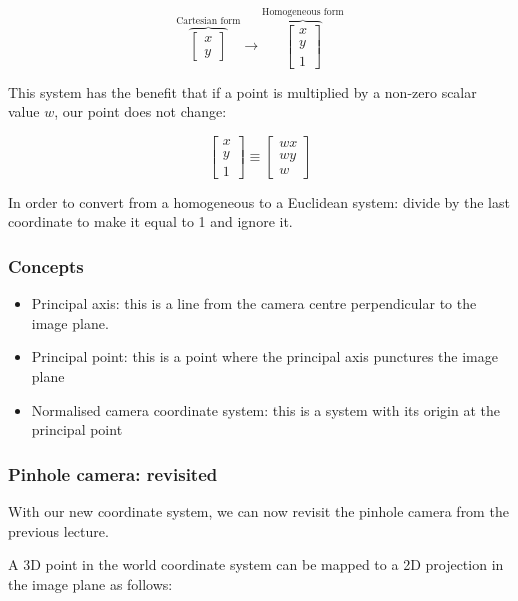 \documentclass{article}
\begin{document}
\[
  \overbrace{\begin{bmatrix}
      x \\y
    \end{bmatrix}}^{\text{Cartesian form}}
  \rightarrow
  \overbrace{\begin{bmatrix}
      x \\y \\ 1
    \end{bmatrix}}^{\text{Homogeneous form}}
\]

This system has the benefit that if a point is multiplied by a non-zero scalar value $w$, our point does not change:

\[
  \begin{bmatrix}
    x \\ y\\ 1
  \end{bmatrix} \equiv
  \begin{bmatrix}
    wx \\ wy \\ w
  \end{bmatrix}
\]

In order to convert from a homogeneous to a Euclidean system: divide by the last coordinate to make it equal to 1 and ignore it.


\subsubsection{Concepts}

\begin{itemize}
  \item Principal axis: this is a line from the camera centre perpendicular to the image plane.
  \item Principal point: this is a point where the principal axis punctures the image plane
  \item Normalised camera coordinate system: this is a system with its origin at the principal point
\end{itemize}

\subsubsection{Pinhole camera: revisited}

With our new coordinate system, we can now revisit the pinhole camera from the previous lecture.

A 3D point in the world coordinate system can be mapped to a 2D projection in the image plane as follows:
\end{document}
